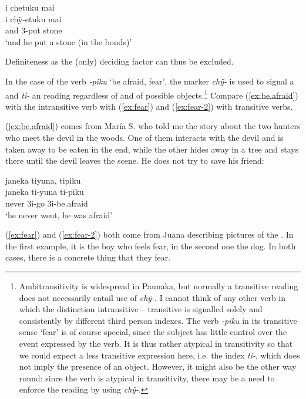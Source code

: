 \ea\label{ex:chÿ-indef}
\begingl
\glpreamble i chetuku mai\\
\gla i chÿ-etuku mai\\
\glb and 3-put stone\\
\glft ‘and he put a stone (in the bonds)’
\endgl
\trailingcitation{[jmx-n120429ls-x5.259]}
\xe

Definiteness as the (only) deciding factor can thus be excluded. 

In the case of the verb \textit{-piku} ‘be afraid, fear’, the marker \textit{chÿ-} is used to signal a  and \textit{ti-} an  reading regardless of  and  of possible objects.\footnote{Ambitransitivity is widespread in Paunaka, but normally a transitive reading does not necessarily entail use of \textit{chÿ-}. I cannot think of any other verb in which the distinction intransitive – transitive is signalled solely and consistently by different third person indexes. The verb \textit{-piku} in its transitive sense ‘fear’ is of course special, since the subject has little control over the event expressed by the verb. It is thus rather atypical in transitivity \citep[cf.][252]{HopperThompson1980} so that we could expect a less transitive expression here, i.e. the index \textit{ti-}, which does not imply the presence of an object. However, it might also be the other way round: since the verb is atypical in transitivity, there may be a need to enforce the  reading by using \textit{chÿ-}.} Compare (\ref{ex:be.afraid}) with the intransitive verb with (\ref{ex:fear}) and (\ref{ex:fear-2}) with transitive verbs.

(\ref{ex:be.afraid}) comes from María S. who told me the story about the two hunters who meet the devil in the woods. One of them interacts with the devil and is taken away to be eaten in the end, while the other hides away in a tree and stays there until the devil leaves the scene. He does not try to save his friend:

\ea\label{ex:be.afraid}
\begingl 
\glpreamble janeka tiyuna, tipiku\\
\gla janeka ti-yuna ti-piku\\ 
\glb never 3i-go 3i-be.afraid\\ 
\glft ‘he never went, he was afraid’\\ 
\endgl
\trailingcitation{[rxx-n120511l-2.61]}
\xe

(\ref{ex:fear}) and (\ref{ex:fear-2}) both come from Juana describing pictures of the . In the first example, it is the boy who feels fear, in the second one the dog. In both cases, there is a concrete thing that they fear.

